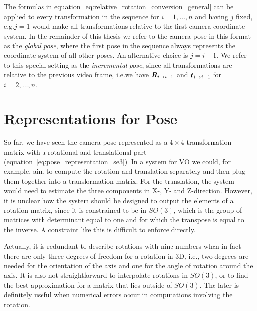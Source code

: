 		The formulas in equation~\ref{eq:relative_rotation_conversion_general} can be applied to every transformation in the sequence for $i = 1, \dots, n$ and having $j$ fixed, e.g.\@ $j = 1$ would make all transformations relative to the first camera coordinate system.
		In the remainder of this thesis we refer to the camera pose in this format as the \emph{global pose}, where the first pose in the sequence always represents the coordinate system of all other poses.
		An alternative choice is $j = i - 1$.
		We refer to this special setting as the \emph{incremental pose}, since all transformations are relative to the previous video frame, i.e.\@ we have 
		$\bm{R}_{i \rightarrow i - 1}$ and $\bm{t}_{i \rightarrow i - 1}$
		for $i = 2, \dots, n$.
		
	\section{Representations for Pose}
		
		So far, we have seen the camera pose represented as a $4 \times 4$ transformation matrix with a rotational and translational part (equation~\ref{eq:pose_representation_se3}).
		In a system for VO we could, for example, aim to compute the rotation and translation separately and then plug them together into a transformation matrix.
		For the translation, the system would need to estimate the three components in X-, Y- and Z-direction.
		However, it is unclear how the system should be designed to output the elements of a rotation matrix, since it is constrained to be in 
		$SO(3)$, which is the group of matrices with determinant equal to one and for which the transpose is equal to the inverse.
		A constraint like this is difficult to enforce directly.
		
		Actually, it is redundant to describe rotations with nine numbers when in fact there are only three degrees of freedom for a rotation in 3D, i.e., two degrees are needed for the orientation of the axis and one for the angle of rotation around the axis.
		It is also not straightforward to interpolate rotations in $SO(3)$, or to find the best approximation for a matrix that lies outside of $SO(3)$.
		The later is definitely useful when numerical errors occur in computations involving the rotation.
		
